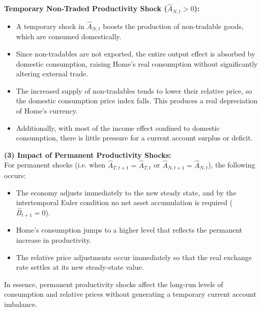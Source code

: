 \documentclass[a4paper,12pt]{article} %
\theoremstyle{nonitalic}
\begin{document}
\textbf{Temporary Non-Traded Productivity Shock (\( \widehat{A}_{N,t} > 0 \)):}
\begin{itemize}
    \item A temporary shock in \( \widehat{A}_{N,t} \) boosts the production of non-tradable goods, which are consumed domestically.
    \item Since non-tradables are not exported, the entire output effect is absorbed by domestic consumption, raising Home's real consumption without significantly altering external trade.
    \item The increased supply of non-tradables tends to lower their relative price, so the domestic consumption price index falls. This produces a real depreciation of Home's currency.
    \item Additionally, with most of the income effect confined to domestic consumption, there is little pressure for a current account surplus or deficit.
\end{itemize}

\textbf{(3) Impact of Permanent Productivity Shocks:}\\[1mm]
For permanent shocks (i.e. when \( \widehat{A}_{T,t+1} = \widehat{A}_{T,t} \) or \( \widehat{A}_{N,t+1} = \widehat{A}_{N,t} \)), the following occurs:
\begin{itemize}
    \item The economy adjusts immediately to the new steady state, and by the intertemporal Euler condition no net asset accumulation is required (\( \widehat{B}_{t+1} = 0 \)).
    \item Home's consumption jumps to a higher level that reflects the permanent increase in productivity.
    \item The relative price adjustments occur immediately so that the real exchange rate settles at its new steady-state value.
\end{itemize}
In essence, permanent productivity shocks affect the long-run levels of consumption and relative prices without generating a temporary current account imbalance.
\end{document}
